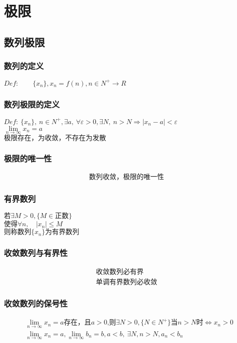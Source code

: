\section{极限}\label{zhang_limit}
\subsection{数列极限}
\subsubsection{数列的定义}
\begin{center}
$Def:\qquad \{x_n\},x_n = f(n),n\in N^+\rightarrow R $
\end{center}
\subsubsection{数列极限的定义}
$Def:\ \{x_n\},\ n\in N^+,\exists  a,\ \forall\varepsilon>0,\exists N,\ n>N\Rightarrow \left|x_n-a\right|<\varepsilon$\\
$\lim\limits_{n \to \infty}{x_n}=a$\\ 
$\mbox{极限存在，为收敛，不存在为发散}$
\subsubsection{极限的唯一性}
\begin{align}
\mbox{数列收敛，极限的唯一性}\label{limit_sequence}
\end{align}
\subsubsection{有界数列}
\begin{center}
    $\mbox{若}\exists M>0,\{M\in\mbox{正数}\}$\\
    $\mbox{使得}\forall n,\quad\left|x_n\right|\leqslant M$\\
    $\mbox{则称数列$\{x_n\}$为有界数列}$
\end{center}
\subsubsection{收敛数列与有界性}
\begin{align}
    \mbox{收敛数列必有界}\label{sequence_bounded_1}\\
    \mbox{单调有界数列必收敛}\label{sequence_bounded_2}
\end{align}
\subsubsection{收敛数列的保号性}
\begin{align}
   &\mbox{$\lim\limits_{n \to\infty}x_n=a$存在，且$a>0$,则$\exists N>0,\{N\in N^+\}$当$n>N$时$\Leftrightarrow x_n>0$}\label{Serial_number_preservation_a}\\
    &\lim\limits_{n\to\infty}x_n=a,\lim\limits_{n\to\infty}b_n=b,a<b,\ \exists N,n>N,a_n<b_n \label{Serial_number_preservation_b}
\end{align}
